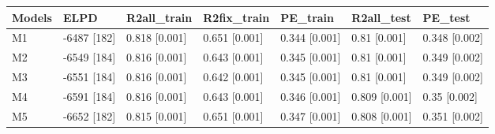 \begin{table}[ht]
\centering
\begin{tabular}{lllllll}
  \hline
Models & ELPD & R2all\_train & R2fix\_train & PE\_train & R2all\_test & PE\_test \\ 
  \hline
M1 & -6487 [182] & 0.818 [0.001] & 0.651 [0.001] & 0.344 [0.001] & 0.81 [0.001] & 0.348 [0.002] \\ 
  M2 & -6549 [184] & 0.816 [0.001] & 0.643 [0.001] & 0.345 [0.001] & 0.81 [0.001] & 0.349 [0.002] \\ 
  M3 & -6551 [184] & 0.816 [0.001] & 0.642 [0.001] & 0.345 [0.001] & 0.81 [0.001] & 0.349 [0.002] \\ 
  M4 & -6591 [184] & 0.816 [0.001] & 0.643 [0.001] & 0.346 [0.001] & 0.809 [0.001] & 0.35 [0.002] \\ 
  M5 & -6652 [182] & 0.815 [0.001] & 0.651 [0.001] & 0.347 [0.001] & 0.808 [0.001] & 0.351 [0.002] \\ 
   \hline
\end{tabular}
\end{table}
